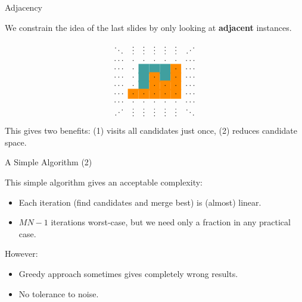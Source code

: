 \documentclass[11pt]{beamer}
\begin{document}
\begin{frame}{Adjacency}

We constrain the idea of the last slides by only looking at \textbf{adjacent} instances.

$$
\begin{matrix}
\ddots & \vdots & \vdots & \vdots & \vdots & \vdots & \iddots \\[-.2em]
\cdots & \cdot & \cdot & \cdot & \cdot & \cdot & \cdots \\[-.2em]
\cdots & \cdot & \cellcolor{teal!75} & \cellcolor{teal!75} & \cellcolor{teal!75} & \cellcolor{red!45!yellow}\cdot & \cdots \\[-.2em]
\cdots & \cdot & \cellcolor{teal!75} & \cellcolor{red!45!yellow}\cdot & \cellcolor{teal!75} & \cellcolor{red!45!yellow}\cdot & \cdots \\[-.2em]
\cdots & \cdot & \cellcolor{teal!75} & \cellcolor{red!45!yellow}\cdot & \cellcolor{red!45!yellow}\cdot & \cellcolor{red!45!yellow}\cdot & \cdots \\[-.2em]
\cdots & \cellcolor{red!45!yellow}\cdot & \cellcolor{red!45!yellow}\cdot & \cellcolor{red!45!yellow}\cdot & \cellcolor{red!45!yellow}\cdot & \cellcolor{red!45!yellow}\cdot & \cdots \\[-.2em]
\cdots & \cdot & \cdot & \cdot & \cdot & \cdot & \cdots \\[-.4em]
\iddots & \vdots & \vdots & \vdots & \vdots & \vdots & \ddots
\end{matrix}
$$
This gives two benefits: (1) visits all candidates just once, (2) reduces candidate space.

\end{frame}



\begin{frame}{A Simple Algorithm (2)}

This simple algorithm gives an acceptable complexity:
\begin{itemize}
\item Each iteration (find candidates and merge best) is (almost) linear.
\item $MN-1$ iterations worst-case, but we need only a fraction in any practical case.
\end{itemize}
\bigskip
However:
\begin{itemize}
\item Greedy approach sometimes gives completely wrong results.
\item No tolerance to noise.
\end{itemize}

\end{frame}
\end{document}
